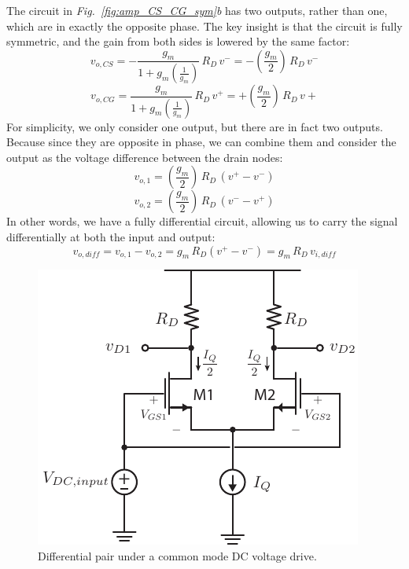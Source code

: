 \newpage
The circuit in \emph{Fig.~\ref{fig:amp_CS_CG_sym}b} has two outputs, rather than one, which are in exactly the opposite phase.  The key insight is that the circuit is fully symmetric, and the gain from both sides is lowered by the same factor:
    \begin{equation}
        v_{o,CS} = -\frac{g_m}{1 + g_m\left(\frac{1}{g_m}\right)}\,R_D\,v^- = -\left(\frac{g_m}{2}\right)\,R_D\,v^-
    \end{equation}
    \begin{equation}
        v_{o,CG} = \frac{g_m}{1 + g_m\left(\frac{1}{g_m}\right)}\,R_D\,v^+ = +\left(\frac{g_m}{2}\right)\,R_D\,v+
    \end{equation}
For simplicity, we only consider one output, but there are in fact two outputs.  Because since they are opposite in phase, we can combine them and consider the output as the voltage difference between the drain nodes:
    \begin{equation}
        v_{o,1} = \left(\frac{g_m}{2}\right)\,R_D\,(v^+ - v^-)  
    \end{equation}
    \begin{equation}
        v_{o,2} = \left(\frac{g_m}{2}\right)\,R_D\,(v^- - v^+)  
    \end{equation}
In other words, we have a fully differential circuit, allowing us to carry the signal differentially at both the input and output:
    \begin{equation}
        v_{o,diff} = v_{o,1} - v_{o,2} = g_m\,R_D (v^+ - v^-) = g_m\,R_D\,v_{i,diff}  
    \end{equation}
\vspace{0.25cm}
\begin{figure}[H]
\centering
\includegraphics[scale=1.45]{diffamp_cm_dc}
\caption{Differential pair under a common mode DC voltage drive.}
\label{fig:diffamp_cm_dc}
\end{figure}
